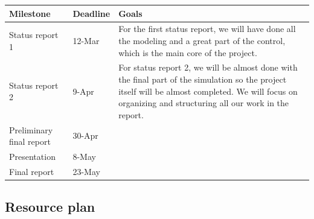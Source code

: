 \documentclass{article}
\begin{document}
		\begin{center}	
			\bigskip
			\begin{tabular}{|C{3cm}|C{3cm}|C{8.5cm}|}
				Milestone & Deadline & Goals \\ \hline
				Status report 1 & 12-Mar & For the first status report, we will have done all the modeling and a great part of the control, which is the main core of the project.\\ \hline
				Status report 2 & 9-Apr & For status report 2, we will be almost done with the final part of the simulation so the project itself will be almost completed. We will focus on organizing and structuring all our work in the report. \\ \hline
				Preliminary final report & 30-Apr & \\ \hline
				Presentation & 8-May & \\ \hline
				Final report & 23-May & \\ \hline
			\end{tabular}
		\end{center}	
	\subsection{Resource plan}
\end{document}
